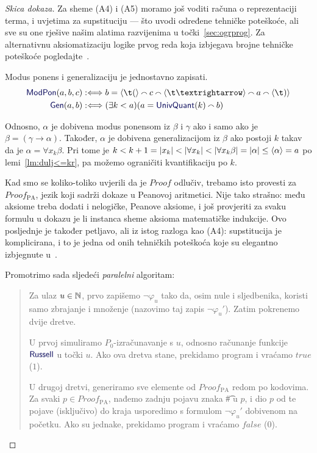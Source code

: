 \begin{proof}[Skica dokaza]
	Za sheme (A4) i (A5) moramo još voditi računa o reprezentaciji terma, i uvjetima za supstituciju --- što uvodi određene tehničke poteškoće, ali sve su one rješive našim alatima razvijenima u točki~\ref{sec:ogrprog}. Za alternativnu aksiomatizaciju logike prvog reda koja izbjegava brojne tehničke poteškoće pogledajte~\cite{smullyan}.

Modus ponens i generalizaciju je jednostavno zapisati.
\begin{align}
    \f{ModPon}(a,b,c)&:\Longleftrightarrow b=
    \kr{\t(}\conc{}
    c\conc{}
    \kr{\t\textrightarrow}\conc{}
    a\conc{}\kr{\t)}\\
    \f{Gen}(a,b)&:\Longleftrightarrow
    (\exists k<a)(a=\f{UnivQuant}(k)\conc{}b)
\end{align}

	Odnosno, $\alpha$ je dobivena modus ponensom iz $\beta$ i $\gamma$ ako i samo ako je $\beta=(\gamma\to\alpha)$. Također, $\alpha$ je dobivena generalizacijom iz $\beta$ ako postoji $k$ takav da je $\alpha=\forall x_k\beta$. Pri tome je $k<k+1=\lvert x_k\rvert<\lvert\forall x_k\rvert<\lvert\forall x_k\beta\rvert=\lvert\alpha\rvert\le\langle\alpha\rangle=a$ po lemi~\ref{lm:dulj<=kr}, pa možemo ograničiti kvantifikaciju po $k$.

    Kad smo se koliko-toliko uvjerili da je $Proof$ odlučiv\!, trebamo isto provesti za $Proof_{\text{PA}}$, jezik koji sadrži dokaze u Peanovoj aritmetici. Nije tako strašno: među aksiome treba dodati i nelogičke, Peanove aksiome, i još provjeriti za svaku formulu u dokazu je li instanca sheme aksioma matematičke indukcije. Ovo posljednje je također petljavo, ali iz istog razloga kao (A4): supstitucija je komplicirana, i to je jedna od onih tehničkih poteškoća koje su elegantno izbjegnute u~\cite{smullyan}.

Promotrimo sada sljedeći \emph{paralelni} algoritam:
\begin{quote}
    Za ulaz $u\in{\mathbb N}$, prvo zapišemo $\neg\varphi_u$ tako da, osim nule i sljedbenika, koristi samo zbrajanje i množenje (nazovimo taj zapis $\neg\varphi_u'$). Zatim pokrenemo dvije dretve.

    U prvoj simuliramo $P_0$-izračunavanje s $u$, odnosno računanje funkcije $\f{Russell}$ u točki $u$. Ako ova dretva stane, prekidamo program i vraćamo $\mathit{true}$ ($1$).

    U drugoj dretvi, generiramo sve elemente od $Proof_{\text{PA}}$ redom po kodovima. Za svaki $p\in Proof_{\text{PA}}$, nađemo zadnju pojavu znaka \t\# u $p$, i dio $p$ od te pojave (isključivo) do kraja usporedimo s formulom $\neg\varphi_u'$ dobivenom na početku. Ako su jednake, prekidamo program i vraćamo $\mathit{false}$ ($0$).
\end{quote}


\end{proof}
